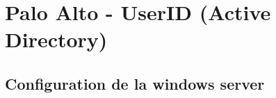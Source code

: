 \documentclass[a4paper]{article}
\begin{document}
\newpage \section{Palo Alto - UserID (Active Directory)}










\subsection{Configuration de la windows server}
\end{document}
